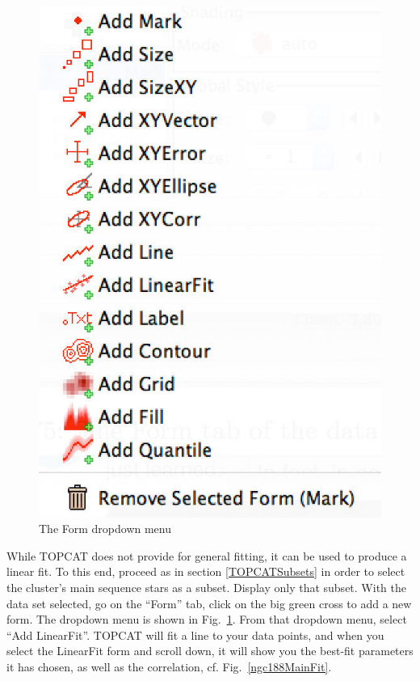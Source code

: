 \documentclass[twocolumn,apj]{openjournal}
\begin{document}
\begin{figure}[htbp]
\begin{center}
\includegraphics[width=0.45\linewidth]{formDropdown.jpg}
\caption{The Form dropdown menu}
\label{FormDropdown}
\end{center}
\end{figure}
While TOPCAT does not provide for general fitting, it can be used to produce a linear fit. To this end, proceed as in section \ref{TOPCATSubsets} in order to select the cluster's main sequence stars as a subset. Display only that subset. With the data set selected, go on the ``Form'' tab, click on the big green cross to add a new form. The dropdown menu is shown in Fig.~\ref{FormDropdown}.
From that dropdown menu, select ``Add LinearFit''. TOPCAT will fit a line to your data points, and when you select the LinearFit form and scroll down, it will show you the best-fit parameters it has chosen, as well as the correlation, cf. Fig.~\ref{ngc188MainFit}.
\end{document}
